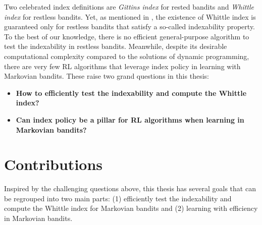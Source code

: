 Two celebrated index definitions are \emph{Gittins index} \cite{gittins1979bandit} for rested bandits and \emph{Whittle index} \cite{whittle1988restless} for restless bandits.
Yet, as mentioned in \cite[Chapter~14]{whittle1996optimal}, the existence of Whittle index is guaranteed only for restless bandits that satisfy a so-called indexability property.
To the best of our knowledge, there is no efficient general-purpose algorithm to test the indexability in restless bandits.
Meanwhile, despite its desirable computational complexity compared to the solutions of dynamic programming, there are very few RL algorithms that leverage index policy in learning with Markovian bandits.
These raise two grand questions in this thesis:
\begin{itemize}
    \item {\color{myblue}\bfseries\large How to efficiently test the indexability and compute the Whittle index?}
    \item {\color{myblue}\bfseries\large Can index policy be a pillar for RL algorithms when learning in Markovian bandits?}
\end{itemize}

\section{Contributions}

Inspired by the challenging questions above, this thesis has several goals that can be regrouped into two main parts: (1) efficiently test the indexability and compute the Whittle index for Markovian bandits and (2) learning with efficiency in Markovian bandits.


